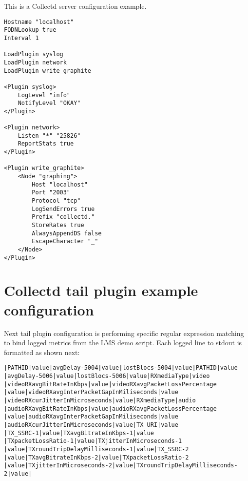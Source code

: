 This is a Collectd server configuration example.

\begin{verbatim}
Hostname "localhost"
FQDNLookup true
Interval 1

LoadPlugin syslog
LoadPlugin network
LoadPlugin write_graphite

<Plugin syslog>
	LogLevel "info"
	NotifyLevel "OKAY"
</Plugin>

<Plugin network>
	Listen "*" "25826"
	ReportStats true
</Plugin>

<Plugin write_graphite>
	<Node "graphing">
		Host "localhost"
		Port "2003"
		Protocol "tcp"
		LogSendErrors true
		Prefix "collectd."
		StoreRates true
		AlwaysAppendDS false
		EscapeCharacter "_"
	</Node>
</Plugin>
\end{verbatim}

\section{Collectd tail plugin example configuration}\label{ANX:collectdTailFiles2}

Next tail plugin configuration is performing specific regular expression matching to bind logged metrics from the LMS demo script. Each logged line to stdout is formatted as shown next:

\begin{verbatim}
|PATHID|value|avgDelay-5004|value|lostBlocs-5004|value|PATHID|value
|avgDelay-5006|value|lostBlocs-5006|value|RXmediaType|video
|videoRXavgBitRateInKbps|value|videoRXavgPacketLossPercentage
|value|videoRXavgInterPacketGapInMiliseconds|value
|videoRXcurJitterInMicroseconds|value|RXmediaType|audio
|audioRXavgBitRateInKbps|value|audioRXavgPacketLossPercentage
|value|audioRXavgInterPacketGapInMiliseconds|value
|audioRXcurJitterInMicroseconds|value|TX_URI|value
|TX_SSRC-1|value|TXavgBitrateInKbps-1|value
|TXpacketLossRatio-1|value|TXjitterInMicroseconds-1
|value|TXroundTripDelayMilliseconds-1|value|TX_SSRC-2
|value|TXavgBitrateInKbps-2|value|TXpacketLossRatio-2
|value|TXjitterInMicroseconds-2|value|TXroundTripDelayMilliseconds-2|value|
\end{verbatim}

